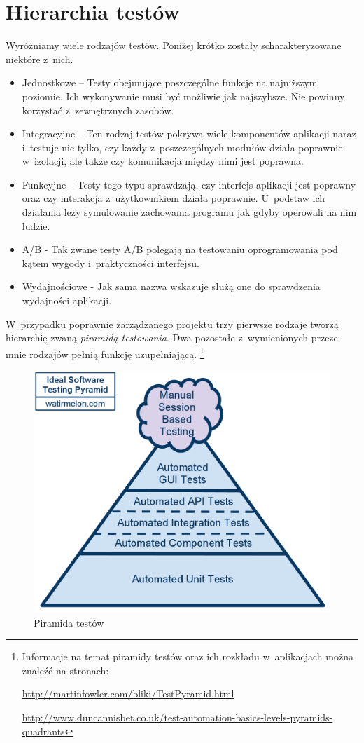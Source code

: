 \documentclass[brudnopis]{xmgr}
\begin{document}
\section{Hierarchia testów}

Wyróżniamy wiele rodzajów testów. Poniżej krótko zostały scharakteryzowane niektóre z~nich.
\begin{itemize}
  \item Jednostkowe -- Testy obejmujące poszczególne funkcje na najniższym poziomie. Ich wykonywanie musi być możliwie jak najszybsze. Nie powinny korzystać z~zewnętrznych zasobów.
  \item Integracyjne -- Ten rodzaj testów pokrywa wiele komponentów aplikacji naraz i~testuje nie tylko, czy każdy z~poszczególnych modułów działa poprawnie w~izolacji, ale także czy komunikacja między nimi jest poprawna.
  \item Funkcyjne -- Testy tego typu sprawdzają, czy interfejs aplikacji jest poprawny oraz czy interakcja z~użytkownikiem działa poprawnie. U~podstaw ich działania leży symulowanie zachowania programu jak gdyby operowali na nim ludzie. 
  \item A/B - Tak zwane testy A/B polegają na testowaniu oprogramowania pod kątem wygody i~praktyczności interfejsu.
  \item Wydajnościowe - Jak sama nazwa wskazuje służą one do sprawdzenia wydajności aplikacji.
\end{itemize}

W~przypadku poprawnie zarządzanego projektu trzy pierwsze rodzaje tworzą hierarchię zwaną \textit{piramidą testowania}. Dwa pozostałe z~wymienionych przeze mnie rodzajów pełnią funkcję uzupełniającą. 
\footnote{
Informacje na temat piramidy testów oraz ich rozkładu w~aplikacjach można znaleźć na stronach:

\url{http://martinfowler.com/bliki/TestPyramid.html}

\url{http://www.duncannisbet.co.uk/test-automation-basics-levels-pyramids-quadrants}
}

\begin{figure}[h]
    \centering
    \includegraphics[scale=0.25]{idealautomatedtestingpyramid.png}
    \caption{Piramida testów}
    \label{fig:pyramis}
\end{figure}
\end{document}
